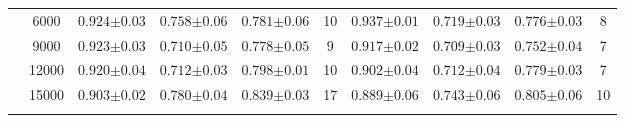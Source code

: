 \begin{table}[hbtp]
\begin{tabularx}{\textwidth}{cc | YYYc | YYYc }
        & 6000 & $0.924{\scriptscriptstyle\pm0.03}$ & $0.758{\scriptscriptstyle\pm0.06}$ & $0.781{\scriptscriptstyle\pm0.06}$ & 10 & $0.937{\scriptscriptstyle\pm0.01}$ & $0.719{\scriptscriptstyle\pm0.03}$ & $0.776{\scriptscriptstyle\pm0.03}$ & 8\\
        & 9000 & $0.923{\scriptscriptstyle\pm0.03}$ & $0.710{\scriptscriptstyle\pm0.05}$ & $0.778{\scriptscriptstyle\pm0.05}$ & 9 & $0.917{\scriptscriptstyle\pm0.02}$ & $0.709{\scriptscriptstyle\pm0.03}$ & $0.752{\scriptscriptstyle\pm0.04}$ & 7\\
        & 12000 & $0.920{\scriptscriptstyle\pm0.04}$ & $0.712{\scriptscriptstyle\pm0.03}$ & $0.798{\scriptscriptstyle\pm0.01}$ & 10 & $0.902{\scriptscriptstyle\pm0.04}$ & $0.712{\scriptscriptstyle\pm0.04}$ & $0.779{\scriptscriptstyle\pm0.03}$ & 7\\
        & 15000 & $0.903{\scriptscriptstyle\pm0.02}$ & $0.780{\scriptscriptstyle\pm0.04}$ & $0.839{\scriptscriptstyle\pm0.03}$ & 17 & $0.889{\scriptscriptstyle\pm0.06}$ & $0.743{\scriptscriptstyle\pm0.06}$ & $0.805{\scriptscriptstyle\pm0.06}$ & 10\\

    \end{tabularx}
\end{table}

